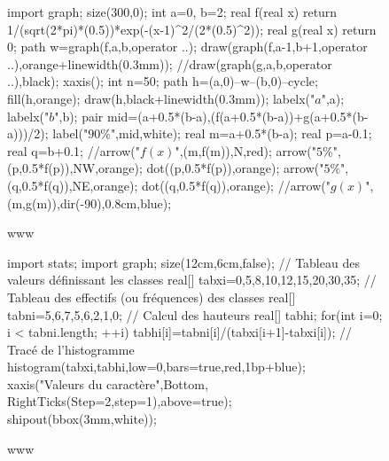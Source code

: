 \documentclass[]{article}
\begin{document}
\begin{figure}[!ht]
	\centering
	\begin{asy}
	import graph;
	size(300,0);
	int a=0, b=2;
	real f(real x) {return 1/(sqrt(2*pi)*(0.5))*exp(-(x-1)^2/(2*(0.5)^2));}
	real g(real x) {return 0;}
	path w=graph(f,a,b,operator ..);
	draw(graph(f,a-1,b+1,operator ..),orange+linewidth(0.3mm));
	//draw(graph(g,a,b,operator ..),black);
	xaxis();
	int n=50;
	path h=(a,0)--w--(b,0)--cycle;
	fill(h,orange);
	draw(h,black+linewidth(0.3mm));
	labelx("$a$",a);
	labelx("$b$",b);
	pair mid=(a+0.5*(b-a),(f(a+0.5*(b-a))+g(a+0.5*(b-a)))/2);
	label("$90\%$",mid,white);
	real m=a+0.5*(b-a);
	real p=a-0.1;
	real q=b+0.1;
	//arrow("$f(x)$",(m,f(m)),N,red);
	arrow("$5\%$",(p,0.5*f(p)),NW,orange);
	dot((p,0.5*f(p)),orange);
	arrow("$5\%$",(q,0.5*f(q)),NE,orange);
	dot((q,0.5*f(q)),orange);
	//arrow("$g(x)$",(m,g(m)),dir(-90),0.8cm,blue);
	\end{asy}
	\caption{www}
\end{figure}


\begin{figure}[!ht]
	\centering
	\begin{asy}
	import stats;
import graph;
size(12cm,6cm,false);
// Tableau des valeurs définissant les classes
real[] tabxi={0,5,8,10,12,15,20,30,35};
// Tableau des effectifs (ou fréquences) des classes
real[] tabni={5,6,7,5,6,2,1,0};
// Calcul des hauteurs
real[] tabhi;
for(int i=0; i < tabni.length; ++i)
  tabhi[i]=tabni[i]/(tabxi[i+1]-tabxi[i]);
// Tracé de l'histogramme
histogram(tabxi,tabhi,low=0,bars=true,red,1bp+blue);
xaxis("Valeurs du caract\`ere",Bottom,
      RightTicks(Step=2,step=1),above=true);
shipout(bbox(3mm,white));
	\end{asy}
	\caption{www}
\end{figure}
\end{document}
